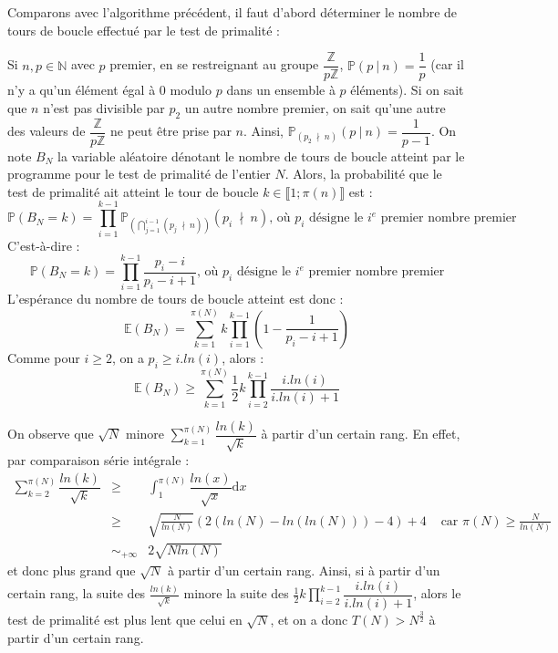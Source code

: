 \documentclass[../main.tex]{subfiles}
\begin{document}
Comparons avec l'algorithme précédent, il faut d'abord déterminer le nombre de tours de boucle effectué par le test de primalité :

Si $n, p\in\mathbb{N}$ avec $p$ premier, en se restreignant au groupe $\dfrac{\mathbb{Z}}{p\mathbb{Z}}$, $\mathbb{P}(p\ |\ n) = \dfrac{1}{p}$ (car il n'y a qu'un élément égal à 0 modulo $p$ dans un ensemble à $p$ éléments). Si on sait que $n$ n'est pas divisible par $p_2$ un autre nombre premier, on sait qu'une autre des valeurs de $\dfrac{\mathbb{Z}}{p\mathbb{Z}}$ ne peut être prise par $n$. Ainsi, $\mathbb{P}_{(p_{2}\ \nmid\ n)}(p\ |\ n) = \dfrac{1}{p-1}$. On note $B_N$ la variable aléatoire dénotant le nombre de tours de boucle atteint par le programme pour le  test de primalité de l'entier $N$. Alors, la probabilité que le test de primalité ait atteint le tour de boucle $k\in{\llbracket1; \pi(n)\rrbracket}$ est :
$$\mathbb{P}(B_N = k) = \displaystyle\prod_{i = 1}^{k-1}\mathbb{P}_{\left(\bigcap_{j=1}^{i-1}(p_j\ \nmid\ n)\right)}(p_i\ \nmid\ n)\text{, où }p_{i}\text{ désigne le }i^e\text{ premier nombre premier}$$
C'est-à-dire :
$$\mathbb{P}(B_N = k) = \displaystyle\prod_{i = 1}^{k-1}\dfrac{p_i - i}{p_i - i + 1}\text{, où }p_{i}\text{ désigne le }i^e\text{ premier nombre premier}$$
L'espérance du nombre de tours de boucle atteint est donc :
$$\mathbb{E}(B_N) = \displaystyle\sum_{k = 1}^{\pi(N)}k\prod_{i = 1}^{k-1}\left(1 - \dfrac{1}{p_i - i + 1}\right)$$
Comme pour $i \geq 2$, on a $p_i \geq i.ln(i)$, alors :
$$\mathbb{E}(B_N) \geq \displaystyle\sum_{k = 1}^{\pi(N)}\dfrac{1}{2}k\prod_{i = 2}^{k-1}\dfrac{i.ln(i)}{i.ln(i) + 1}$$

On observe que $\sqrt{N}$ minore $\displaystyle\sum_{k = 1}^{\pi(N)}\dfrac{ln(k)}{\sqrt{k}}$ à partir d'un certain rang. En effet, par comparaison série intégrale :
$$\begin{array}{lcll}
\displaystyle\sum_{k = 2}^{\pi(N)}\dfrac{ln(k)}{\sqrt{k}} & \geq & \displaystyle\int_{1}^{\pi(N)}\dfrac{ln(x)}{\sqrt{x}}\mathrm{d}x \\
 & \geq & \sqrt{\frac{N}{ln(N)}}(2(ln(N) - ln(ln(N))) - 4) + 4 & \text{ car }\pi(N)\geq \frac{N}{ln(N)} \\
 & \sim_{+\infty} & 2\sqrt{Nln(N)}
\end{array}$$
et donc plus grand que $\sqrt{N}$ à partir d'un certain rang. Ainsi, si à partir d'un certain rang, la suite des $\frac{ln(k)}{\sqrt{k}}$ minore  la suite des $\frac{1}{2}k\displaystyle\prod_{i = 2}^{k-1}\dfrac{i.ln(i)}{i.ln(i) + 1}$, alors le test de primalité est plus lent que celui en $\sqrt{N}$, et on  a donc $T(N) > N^{\frac{3}{2}}$ à partir d'un certain rang.
\end{document}
